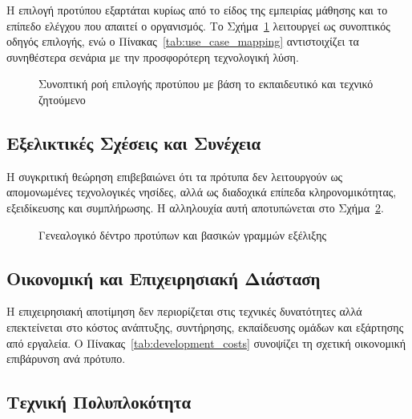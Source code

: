Η επιλογή προτύπου εξαρτάται κυρίως από το είδος της εμπειρίας μάθησης και το επίπεδο ελέγχου που απαιτεί ο οργανισμός. Το Σχήμα~\ref{fig:standard_selection_flow} λειτουργεί ως συνοπτικός οδηγός επιλογής, ενώ ο Πίνακας~\ref{tab:use_case_mapping} αντιστοιχίζει τα συνηθέστερα σενάρια με την προσφορότερη τεχνολογική λύση.

\begin{figure}[H]
  \centering
  \makebox[\textwidth][c]{%
    \resizebox{0.96\textwidth}{!}{%
    }%
  }
  \caption{Συνοπτική ροή επιλογής προτύπου με βάση το εκπαιδευτικό και τεχνικό ζητούμενο}
  \label{fig:standard_selection_flow}
\end{figure}



\subsection{Εξελικτικές Σχέσεις και Συνέχεια}
\label{subsec:evolutionary_relationships}

Η συγκριτική θεώρηση επιβεβαιώνει ότι τα πρότυπα δεν λειτουργούν ως απομονωμένες τεχνολογικές νησίδες, αλλά ως διαδοχικά επίπεδα κληρονομικότητας, εξειδίκευσης και συμπλήρωσης. Η αλληλουχία αυτή αποτυπώνεται στο Σχήμα~\ref{fig:standards_genealogy}.

\begin{figure}[H]
  \centering
  
  \caption{Γενεαλογικό δέντρο  προτύπων και βασικών γραμμών εξέλιξης}
  \label{fig:standards_genealogy}
\end{figure}

\subsection{Οικονομική και Επιχειρησιακή Διάσταση}
\label{subsec:economic_dimension}

Η επιχειρησιακή αποτίμηση δεν περιορίζεται στις τεχνικές δυνατότητες αλλά επεκτείνεται στο κόστος ανάπτυξης, συντήρησης, εκπαίδευσης ομάδων και εξάρτησης από εργαλεία. Ο Πίνακας~\ref{tab:development_costs} συνοψίζει τη σχετική οικονομική επιβάρυνση ανά πρότυπο.



\subsection{Τεχνική Πολυπλοκότητα}
\label{subsec:technical_complexity}

